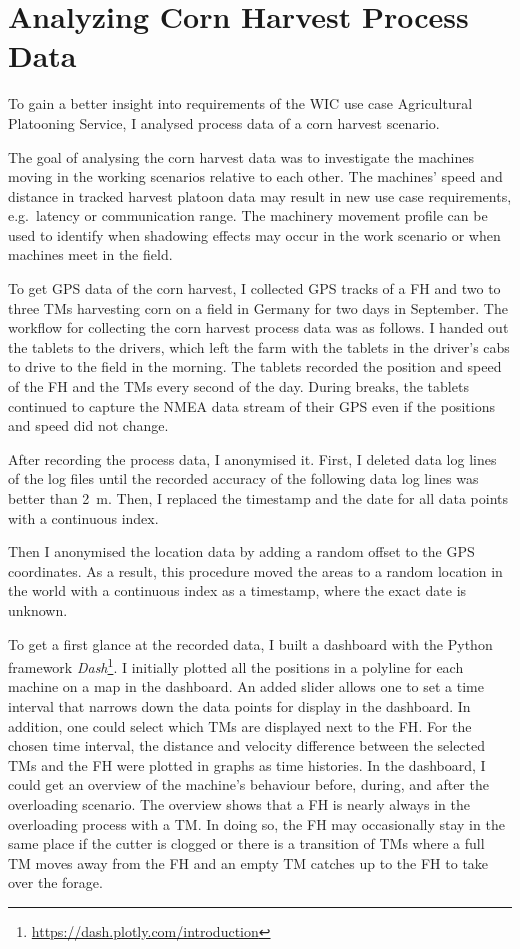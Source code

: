 \chapter{Analyzing Corn Harvest Process Data}
\label{chap:cornHarvestData}
To gain a better insight into requirements of the \ac{WIC} use case Agricultural Platooning Service,
I analysed process data of a corn harvest scenario.

The goal of analysing the corn harvest data was to investigate the machines moving in the working scenarios relative to each other.
The machines' speed and distance in tracked harvest platoon data may result in new use case requirements,
e.g.\ latency or communication range.
The machinery movement profile can be used to identify when shadowing effects may occur in the work scenario or
when machines meet in the field.

To get GPS data of the corn harvest,
I collected GPS tracks of a \ac{FH} and two to three \ac{TM}s harvesting corn on a field in Germany for two days in September.
The workflow for collecting the corn harvest process data was as follows.
I handed out the tablets to the drivers, which left the farm with the tablets in the driver's cabs to drive to
the field in the morning.
The tablets recorded the position and speed of the \ac{FH} and the \ac{TM}s every second of the day.
During breaks, the tablets continued to capture the NMEA data stream of their GPS even if the positions and speed did not change.

After recording the process data, I anonymised it.
First, I deleted data log lines of the log files until the recorded accuracy of the following data log lines was better than
\SI{2}{\metre}.
Then, I replaced the timestamp and the date for all data points with a continuous index.

Then I anonymised the location data by adding a random offset to the GPS coordinates.
As a result, this procedure moved the areas to a random location in the world with a continuous index as a timestamp,
where the exact date is unknown.

To get a first glance at the recorded data, I built a dashboard with the Python framework \textit{Dash}\footnote{\url{https://dash.plotly.com/introduction}}.
I initially plotted all the positions in a polyline for each machine
on a map in the dashboard.
An added slider allows one to set a time interval that narrows down the data points for
display in the dashboard.
In addition, one could select which \ac{TM}s are displayed next to the \ac{FH}.
For the chosen time interval, the distance and velocity difference between the selected \ac{TM}s and the \ac{FH} were
plotted in graphs as time histories.
In the dashboard, I could get an overview of the machine's behaviour
before, during, and after the overloading scenario.
The overview shows that a \ac{FH} is nearly always in the overloading process with a \ac{TM}.
In doing so, the \ac{FH} may occasionally stay in the same place if the cutter is clogged or there is a
transition of \ac{TM}s where a full \ac{TM} moves away from the \ac{FH} and an empty \ac{TM} catches up to the
\ac{FH} to take over the forage.

